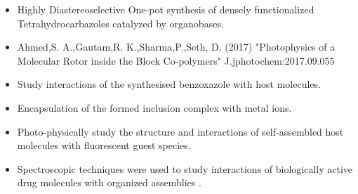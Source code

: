 \documentclass[10pt,a4paper]{altacv}
\begin{document}
\begin{itemize}
\item Highly Diastereoselective One-pot synthesis of densely functionalized Tetrahydrocarbazoles catalyzed by organobases.
\end{itemize}
\begin{itemize}
\item{Ahmed,S. A.,Gautam,R. K.,Sharma,P.,Seth, D. (2017) "Photophysics of a Molecular Rotor inside the Block Co-polymers" J.jphotochem:2017.09.055}
\end{itemize}
\clearpage
{}

\begin{itemize}
\item  Study interactions of the synthesised benzoxazole with
host molecules.
\item  Encapsulation of the formed inclusion complex with metal ions.
\end{itemize}
\divider

\begin{itemize}
\item Photo-physically study the structure and interactions of self-assembled host molecules with
fluorescent guest species.
\end{itemize}
\divider

\begin{itemize}
\item Spectroscopic techniques were used to study interactions of biologically active drug molecules with organized assemblies .
\end{itemize}








\end{document}
